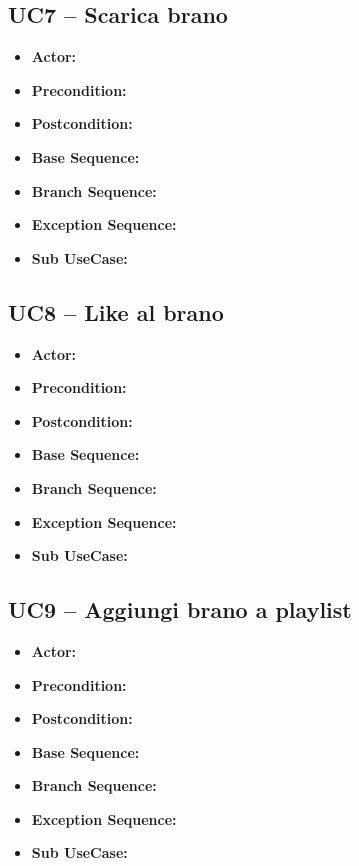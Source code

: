 \subsection{\textbf{UC7 -- Scarica brano}}
\begin{itemize}
    \item \textbf{Actor:}
    \item \textbf{Precondition:}
    \item \textbf{Postcondition:}
    \item \textbf{Base Sequence:}
    \item \textbf{Branch Sequence:}
    \item \textbf{Exception Sequence:}
    \item \textbf{Sub UseCase:}
\end{itemize}

\subsection{\textbf{UC8 -- Like al brano}}
\begin{itemize}
    \item \textbf{Actor:}
    \item \textbf{Precondition:}
    \item \textbf{Postcondition:}
    \item \textbf{Base Sequence:}
    \item \textbf{Branch Sequence:}
    \item \textbf{Exception Sequence:}
    \item \textbf{Sub UseCase:}
\end{itemize}

\subsection{\textbf{UC9 -- Aggiungi brano a playlist}}
\begin{itemize}
    \item \textbf{Actor:}
    \item \textbf{Precondition:}
    \item \textbf{Postcondition:}
    \item \textbf{Base Sequence:}
    \item \textbf{Branch Sequence:}
    \item \textbf{Exception Sequence:}
    \item \textbf{Sub UseCase:}
\end{itemize}

